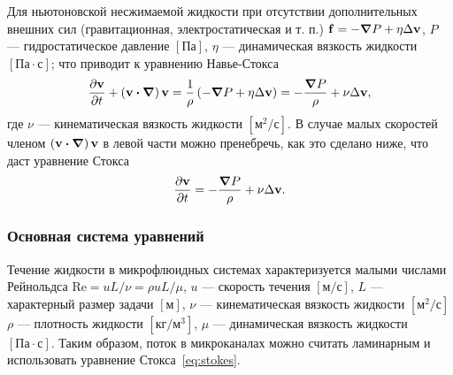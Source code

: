 \documentclass[oneside,final,12pt]{extreport}
\newcommand\bcdot[0]{\boldsymbol\cdot}
\newcommand\bnabla[0]{\boldsymbol\nabla}
\begin{document}
Для ньютоновской несжимаемой жидкости при отсутствии дополнительных внешних сил
(гравитационная, электростатическая и т. п.)
$\vb f = - \grad P + \eta \Delta \vb v$,
$P$ --- гидростатическое давление $\left[\text{Па}\right]$,
$\eta$ --- динамическая вязкость жидкости $\left[\text{Па}\cdot\text{с}\right]$;
что приводит к уравнению Навье-Стокса\cite{bib:ll}
\begin{equation}
  \frac{\partial \vb v}{\partial t} + \left(\vb v \bcdot \bnabla\right) \vb v =
    \frac{1}{\rho}\left(-\grad P + \eta \Delta \vb v\right) =
    -\frac{\grad P}{\rho} + \nu \Delta \vb v,
\label{eq:navier-stokes}
\end{equation}
где $\nu$ --- кинематическая вязкость жидкости $\left[\text{м}^2/\text{с}\right]$.
В случае малых скоростей членом $\left(\vb v \bcdot \bnabla\right) \vb v$
в левой части можно пренебречь, как это сделано ниже, что даст уравнение Стокса
\begin{equation}
  \frac{\partial \vb v}{\partial t} = -\frac{\grad P}{\rho} + \nu \Delta \vb v.
\label{eq:stokes}
\end{equation}

\subsubsection*{Основная система уравнений}
Течение жидкости в микрофлюидных системах характеризуется малыми числами
Рейнольдса $\text{Re} = u L / \nu = \rho u L / \mu$,
$u$ --- скорость течения $\left[\text{м}/\text{с}\right]$,
$L$ --- характерный размер задачи $\left[\text{м}\right]$,
$\nu$ --- кинематическая вязкость жидкости $\left[\text{м}^2/\text{с}\right]$
$\rho$ --- плотность жидкости $\left[\text{кг}/\text{м}^3\right]$,
$\mu$ --- динамическая вязкость жидкости $\left[\text{Па}\cdot\text{с}\right]$.
Таким образом, поток в микроканалах можно считать ламинарным и использовать
уравнение Стокса~\eqref{eq:stokes}.

\end{document}
